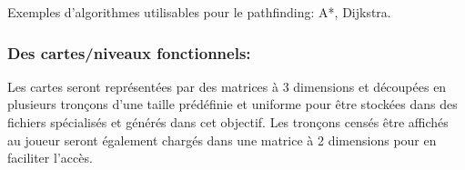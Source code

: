 \documentclass[french, 12pt]{article}
\begin{document}
\begin{flushleft}
        \color{black}
        Exemples d’algorithmes utilisables pour le pathfinding: A*, Dijkstra. 

        \hspace*{6mm} \subsubsection{Des cartes/niveaux fonctionnels:}
        \vspace*{1mm}
        
        Les cartes seront représentées par des matrices à 3 dimensions et découpées en plusieurs tronçons d’une taille prédéfinie et uniforme pour être stockées dans des fichiers spécialisés et générés dans cet objectif. Les tronçons censés être affichés au joueur seront également chargés dans une matrice à 2 dimensions pour en faciliter l’accès. 
        
    \end{flushleft}\newpage

    
\end{document}

